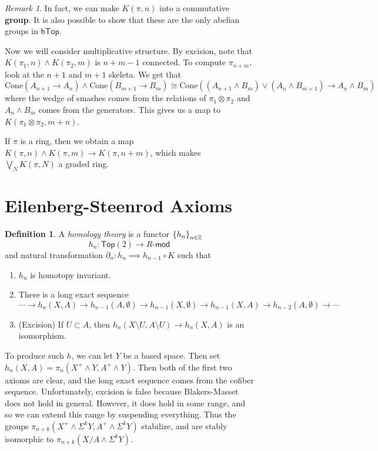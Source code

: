 \documentclass[leqno, openany]{memoir}
\theoremstyle{definition}
\newtheorem{defn}[thm]{Definition}
\theoremstyle{remark}
\newtheorem{rmk}[thm]{Remark}
\theoremstyle{plain}
\theoremstyle{definition}
\theoremstyle{remark}
\newcommand{\Z}{\mathbb{Z}}
\newcommand{\mr}[1]{\mathrm{#1}}
\newcommand{\ms}[1]{\mathsf{#1}}
\newcommand{\ol}[1]{\overline{#1}}
\begin{document}
\begin{figure}[H]
\begin{rmk} In fact, we can make $K(\pi, n)$ into a commutative \textbf{group}.
It is also possible to show that these are the only abelian groups in
$\ms{hTop}$.  \end{rmk}

Now we will consider multiplicative structure. By excision, note that $K(\pi_1,
n) \wedge K(\pi_2, m)$ is $n+m-1$ connected. To compute $\pi_{n+m}$, look at
the $n+1$ and $m+1$ skeleta. We get that \[\mr{Cone}(A_{n+1} \to A_n) \wedge
\mr{Cone}(B_{m+1} \to B_m) \cong \mr{Cone}((A_{n+1} \wedge B_m) \vee (A_n
\wedge B_{m+1}) \to A_n \wedge B_m) \] where the wedge of smashes comes from
the relations of $\pi_1 \otimes \pi_2$ and $A_n \wedge B_m$ comes from the
generators. This gives us a map to $K(\pi_1 \otimes \pi_2, m+n)$.

If $\pi$ is a ring, then we obtain a map $K(\pi, n) \wedge K(\pi, m) \to K(\pi,
n+m)$, which makes $\bigvee_N K(\pi, N)$ a graded ring.

\section{Eilenberg-Steenrod Axioms}%

\begin{defn} A \textit{homology theory} is a functor $\qty{h_n}_{n \in \Z}$ \[
    h_n \colon \ms{Top}(2) \to R\text{-}\ms{mod} \] and natural transformation
    $\partial_n \colon h_n \implies h_{n-1} \circ K$ such that
    \begin{enumerate} \item $h_n$ is homotopy invariant.  \item There is a long
        exact sequence \[ \cdots \to h_n(X, A) \to h_{n-1}(A, \emptyset) \to
        h_{n-1}(X, \emptyset) \to h_{n-1}(X,A) \to h_{n-2}(A, \emptyset) \to
    \cdots \] \item (Excision) If $\ol{U} \subset A$, then $h_n(X \setminus U,
    A \setminus U) \to h_n(X, A)$ is an isomorphism.  \end{enumerate}
\end{defn}

To produce such $h$, we can let $Y$ be a based space. Then set $h_n(X, A) =
\pi_n(X^+ \wedge Y, A^+ \wedge Y)$. Then both of the first two axioms are
clear, and the long exact sequence comes from the cofiber sequence.
Unfortunately, excision is false because Blakers-Masset does not hold in
general. However, it does hold in some range, and so we can extend this range
by suspending everything. Thus the groups $\pi_{n+k} (X^+ \wedge \Sigma^k Y,
A^+ \wedge \Sigma^k Y)$ stabilize, and are stably isomorphic to $\pi_{n+k}(X/A
\wedge \Sigma^k Y)$.


\end{figure}
\end{document}
